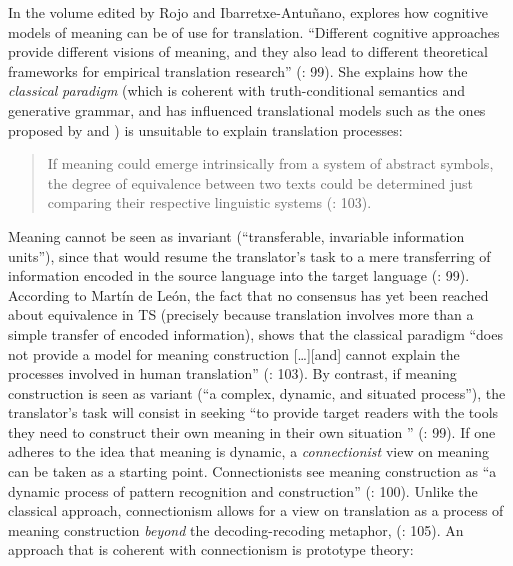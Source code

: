 In the volume edited by Rojo and Ibarretxe-Antuñano, \citet{rojo_who_2013} explores how cognitive models of meaning can be of use for translation. “Different cognitive approaches provide different visions of meaning, and they also lead to different theoretical frameworks for empirical translation research” (\citealt{rojo_who_2013}: 99). She explains how the \textit{classical} \textit{paradigm} (which is coherent with truth-conditional semantics and generative grammar, and has influenced translational models such as the ones proposed by \citet{nida_toward_1964} and  \citet{Kade1968}) is unsuitable to explain translation processes:


\begin{quote}
If meaning could emerge intrinsically from a system of abstract symbols, the degree of equivalence between two texts could be determined just comparing their respective linguistic systems  (\citealt{rojo_who_2013}: 103).
\end{quote}


Meaning cannot be seen as invariant (“transferable, invariable information units”), since that would resume the translator’s task to a mere transferring of information encoded in the source language into the target language (\citealt{rojo_who_2013}: 99). According to Martín de León, the fact that no consensus has yet been reached about equivalence in TS (precisely because translation involves more than a simple transfer of encoded information), shows that the classical paradigm “does not provide a model for meaning construction […][and] cannot explain the processes involved in human translation” (\citealt{rojo_who_2013}: 103). By contrast, if meaning construction is seen as variant (“a complex, dynamic, and situated process”), the translator’s task will consist in seeking “to provide target readers with the tools they need to construct their own meaning in their own situation \citep{risku_translationsmanagement._2004}”  (\citealt{rojo_who_2013}: 99). If one adheres to the idea that meaning is dynamic, a \textit{connectionist} view on meaning can be taken as a starting point. Connectionists see meaning construction as “a dynamic process of pattern recognition and construction” (\citealt{rojo_who_2013}: 100). Unlike the classical approach, connectionism allows for a view on translation as a process of meaning construction \textit{beyond} the decoding-recoding metaphor, (\citealt{rojo_who_2013}: 105). An approach that is coherent with connectionism is prototype theory:


